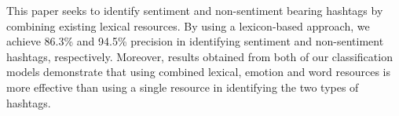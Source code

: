 This paper seeks to identify sentiment and non-sentiment bearing hashtags by combining existing lexical resources. By using a lexicon-based approach, we achieve 86.3\% and 94.5\% precision in identifying sentiment and non-sentiment hashtags, respectively. Moreover, results obtained from both of our classification models demonstrate that using combined lexical, emotion and word resources is more effective than using a single resource in identifying the two types of hashtags.
